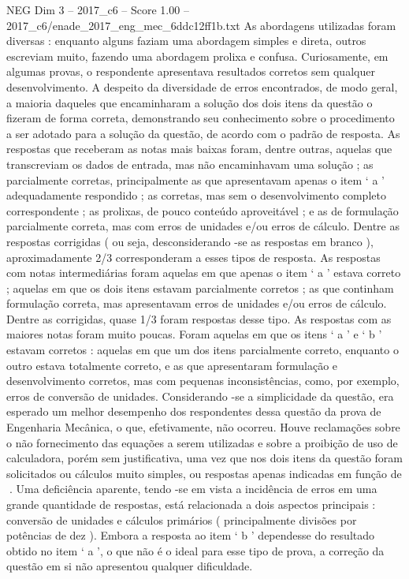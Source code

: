 \begin{textsample}{NEG Dim 3 – 2017\_c6 – Score 1.00 – 2017\_c6/enade\_2017\_eng\_mec\_6ddc12ff1b.txt}
As abordagens utilizadas foram diversas : enquanto alguns faziam uma abordagem simples e direta, outros escreviam muito, fazendo uma abordagem prolixa e confusa.
Curiosamente, em algumas provas, o respondente apresentava resultados corretos sem qualquer desenvolvimento.
A despeito da diversidade de erros encontrados, de modo geral, a maioria daqueles que encaminharam a solução dos dois itens da questão o fizeram de forma correta, demonstrando seu conhecimento sobre o procedimento a ser adotado para a solução da questão, de acordo com o padrão de resposta.
As respostas que receberam as notas mais baixas foram, dentre outras, aquelas que transcreviam os dados de entrada, mas não encaminhavam uma solução ; as parcialmente corretas, principalmente as que apresentavam apenas o item ‘ a ’ adequadamente respondido ; as corretas, mas sem o desenvolvimento completo correspondente ; as prolixas, de pouco conteúdo aproveitável ; e as de formulação parcialmente correta, mas com erros de unidades e/ou erros de cálculo.
Dentre as respostas corrigidas ( ou seja, desconsiderando -se as respostas em branco ), aproximadamente 2/3 corresponderam a esses tipos de resposta.
As respostas com notas intermediárias foram aquelas em que apenas o item ‘ a ’ estava correto ; aquelas em que os dois itens estavam parcialmente corretos ; as que continham formulação correta, mas apresentavam erros de unidades e/ou erros de cálculo.
Dentre as corrigidas, quase 1/3 foram respostas desse tipo.
As respostas com as maiores notas foram muito poucas.
Foram aquelas em que os itens ‘ a ’ e ‘ b ’ estavam corretos : aquelas em que um dos itens parcialmente correto, enquanto o outro estava totalmente correto, e as que apresentaram formulação e desenvolvimento corretos, mas com pequenas inconsistências, como, por exemplo, erros de conversão de unidades.
Considerando -se a simplicidade da questão, era esperado um melhor desempenho dos respondentes dessa questão da prova de Engenharia Mecânica, o que, efetivamente, não ocorreu.
Houve reclamações sobre o não fornecimento das equações a serem utilizadas e sobre a proibição de uso de calculadora, porém sem justificativa, uma vez que nos dois itens da questão foram solicitados ou cálculos muito simples, ou respostas apenas indicadas em função de .
Uma deficiência aparente, tendo -se em vista a incidência de erros em uma grande quantidade de respostas, está relacionada a dois aspectos principais : conversão de unidades e cálculos primários ( principalmente divisões por potências de dez ).
Embora a resposta ao item ‘ b ’ dependesse do resultado obtido no item ‘ a ’, o que não é o ideal para esse tipo de prova, a correção da questão em si não apresentou qualquer dificuldade.

\end{textsample}
